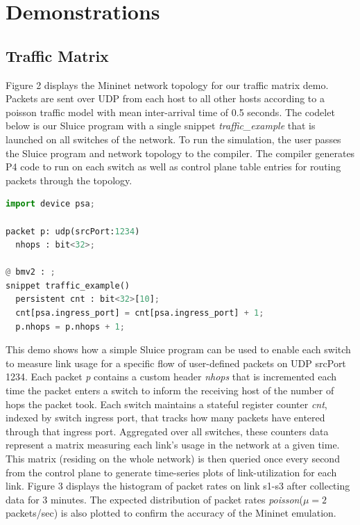 \section{Demonstrations}
 
\subsection{Traffic Matrix}

Figure 2 displays the Mininet network topology for our traffic matrix demo.
Packets are sent over UDP from each host to all other hosts according to a
poisson traffic model with mean inter-arrival time of 0.5 seconds. The codelet
below is our Sluice program with a single snippet \textit{traffic\_example}
that is launched on all switches of the network. To run the simulation, the
user passes the Sluice program and network topology to the compiler. The
compiler generates P4 code to run on each switch as well as control plane table
entries for routing packets through the topology.

\begin{lstlisting}[language=Python, basicstyle=\scriptsize]
import device psa;

packet p: udp(srcPort:1234)
  nhops : bit<32>;

@ bmv2 : ;
snippet traffic_example()
  persistent cnt : bit<32>[10];
  cnt[psa.ingress_port] = cnt[psa.ingress_port] + 1;
  p.nhops = p.nhops + 1;
\end{lstlisting}

This demo shows how a simple Sluice program can be used to enable each switch
to measure link usage for a specific flow of user-defined packets on UDP
srcPort 1234. Each packet \textit{p} contains a custom header \textit{nhops}
that is incremented each time the packet enters a switch to inform the
receiving host of the number of hops the packet took. Each switch maintains a
stateful register counter \textit{cnt}, indexed by switch ingress port, that
tracks how many packets have entered through that ingress port. Aggregated over
all switches, these counters data represent a matrix measuring each link's
usage in the network at a given time. This matrix (residing on the whole
network) is then queried once every second from the control plane to generate
time-series plots of link-utilization for each link. Figure 3 displays the
histogram of packet rates on link s1-s3 after collecting data for 3 minutes.
The expected distribution of packet rates \textit{poisson}($\mu = 2$
packets/sec) is also plotted to confirm the accuracy of the Mininet emulation.

